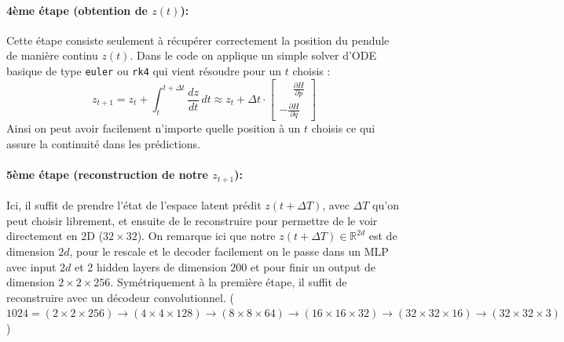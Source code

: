 \documentclass[11pt]{article}
\begin{document}
\paragraph{4ème étape (obtention de $z(t)$):}
Cette étape consiste seulement à récupérer correctement la position du pendule de manière continu $z(t)$. Dans le code on applique un simple solver d'ODE basique de type \texttt{euler} ou \texttt{rk4} qui vient résoudre pour un $t$ choisis :
\begin{equation}
z_{t+1} = z_t + \int_{t}^{t+\Delta t} \frac{dz}{dt} \, dt \approx z_t + \Delta t \cdot
\begin{bmatrix}
\phantom{-}\frac{\partial H}{\partial p} \\ -\frac{\partial H}{\partial q}
\end{bmatrix}
\end{equation}
Ainsi on peut avoir facilement n'importe quelle position à un $t$ choisis ce qui assure la continuité dans les prédictions.

\paragraph{5ème étape (reconstruction de notre $z_{t+1}$):}
Ici, il suffit de prendre l'état de l'espace latent prédit $z(t+\Delta T)$, avec $\Delta T$ qu'on peut choisir librement, et ensuite de le reconstruire pour permettre de le voir directement en 2D ($32 \times 32$). On remarque ici que notre $z(t+\Delta T) \in \mathbb{R}^{2d}$ est de dimension $2d$, pour le rescale et le decoder facilement on le passe dans un MLP avec input $2d$ et 2 hidden layers de dimension $200$ et pour finir un output de dimension $2 \times 2 \times 256$. Symétriquement à la première étape, il suffit de reconstruire avec un décodeur convolutionnel. ($1024 =  (2 \times 2 \times 256) \rightarrow (4 \times 4 \times 128) \rightarrow (8 \times 8 \times 64) \rightarrow (16 \times 16 \times 32) \rightarrow (32 \times 32 \times 16) \rightarrow (32 \times 32 \times 3)$)
\end{document}
